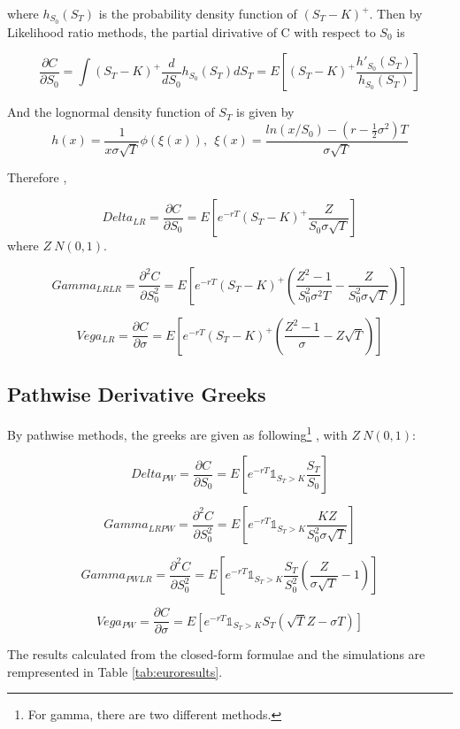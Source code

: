 \documentclass[11pt,a4paper,fleqn]{article}
\begin{document}
where $ h_{S_0}(S_T)$ is the probability density function of $(S_T-K)^+$. Then by Likelihood ratio methods, the partial dirivative of C with respect to $S_0$ is

$$\frac{\partial C}{\partial S_0}=\int(S_T-K)^+\frac{d}{dS_0}h_{S_0}(S_T) dS_T=E[(S_T-K)^+\frac{h'_{S_0}(S_T)}{h_{S_0}(S_T)}] $$

And the lognormal density function of $S_T$ is given by
$$h(x)=\frac{1}{x\sigma \sqrt{T}}\phi(\xi(x)), \ \ \xi(x)=\frac{ln(x/S_0)-(r-\frac{1}{2}\sigma^2)T}{\sigma \sqrt{T}}  $$

Therefore \cite{lectures},

$$Delta_{LR}=\frac{\partial C}{\partial S_0}=E[e^{-rT}(S_T-K)^+\frac{Z}{S_0\sigma\sqrt{T}}]$$
where $Z~N(0,1).$

$$Gamma_{LR LR} = \frac{\partial^2 C}{\partial  S_0^2 }=E[e^{-rT}(S_T-K)^+(\frac{Z^2-1}{S_0^2\sigma^2 T } - \frac{Z}{S_0^2 \sigma \sqrt{T}})]$$

$$Vega_{LR} = \frac{\partial C}{\partial \sigma}=E[e^{-rT}(S_T-K)^+\left(\frac{Z^2-1}{\sigma}-Z\sqrt{T}\right)]$$

\subsection{Pathwise Derivative Greeks}
By pathwise methods, the greeks are given as following\footnote{For gamma, there are two different methods.} \cite{lectures}, with $Z~N(0,1)$:

$$Delta_{PW}=\frac{\partial C}{\partial S_0}=E[e^{-rT}\mathds{1}_{S_T>K}\frac{S_T}{S_0}]$$

$$Gamma_{LRPW} = \frac{\partial^2 C}{\partial  S_0^2 }=E[e^{-rT}\mathds{1}_{S_T>K}\frac{KZ}{S_0^2\sigma\sqrt{T}}]$$

$$Gamma_{PWLR} = \frac{\partial^2 C}{\partial  S_0^2 }=E[e^{-rT}\mathds{1}_{S_T>K}\frac{S_T}{S_0^2}\left(\frac{Z}{\sigma\sqrt{T}}-1\right)]$$

$$Vega_{PW} = \frac{\partial C}{\partial \sigma}=E[e^{-rT}\mathds{1}_{S_T>K}S_T(\sqrt{T}Z-\sigma T)]$$

The results calculated from the closed-form formulae and the simulations are rempresented in Table \ref{tab:euroresults}.
\end{document}
